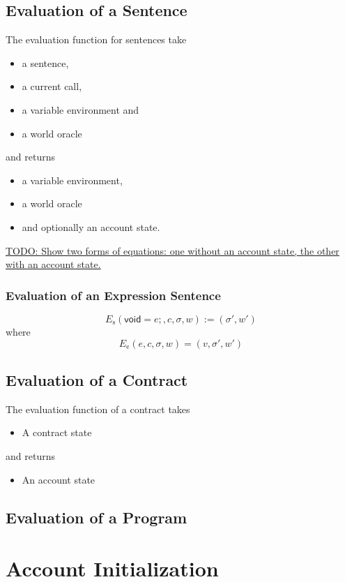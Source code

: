 \documentclass{book}
\newcommand{\todo}[1]{\underline{TODO: {#1}}}
\newcommand{\evalE}[1]{E_\mathrm{e}\left({#1}\right)}
\newcommand{\evalS}[1]{E_\mathrm{s}\left({#1}\right)}
\newcommand{\expressionsentence}[1]{\mathsf{void}={#1}\mathsf{;}}
\begin{document}
\subsection{Evaluation of a Sentence}

The evaluation function for sentences take
\begin{itemize}
\item a sentence,
\item a current call,
\item a variable environment and
\item a world oracle
\end{itemize}
and returns
\begin{itemize}
\item a variable environment,
\item a world oracle
\item and optionally an account state.
\end{itemize}

\todo{Show two forms of equations: one without an account state, the other with an account state.}

\subsubsection{Evaluation of an Expression Sentence}

\[
\evalS{\boxed{\expressionsentence{e}}, c, \sigma, w} := (\sigma', w')
\]
where
\[
\evalE{\boxed{e}, c, \sigma, w} = (v, \sigma', w')
\]

\subsection{Evaluation of a Contract}

The evaluation function of a contract takes
\begin{itemize}
\item A contract state
\end{itemize}
and returns
\begin{itemize}
\item An account state
\end{itemize}

\subsection{Evaluation of a Program}



\section{Account Initialization}
\end{document}
